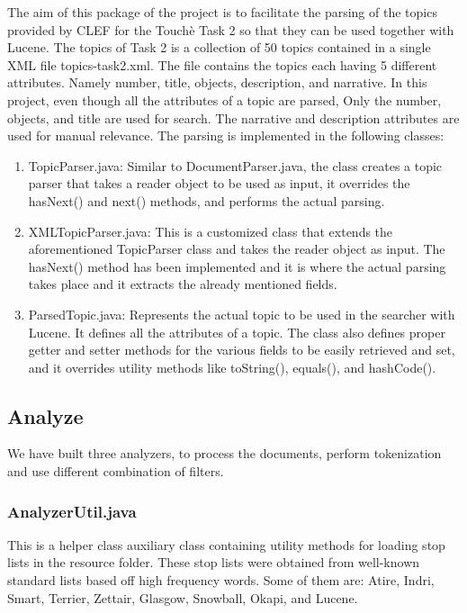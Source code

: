            The aim of this package of the project is to facilitate the parsing of the topics provided by CLEF for the Touchè Task 2 so that they can be used together with Lucene. The topics of Task 2 is a collection of 50 topics contained in a single XML file topics-task2.xml. The file contains the topics each having 5 different attributes. Namely number, title, objects, description, and narrative. In this project, even though all the attributes of a topic are parsed, Only the number, objects, and title are used for search. The narrative and description attributes are used for manual relevance. The parsing is implemented in the following classes:
            \begin{enumerate}
                \item 
                    TopicParser.java: Similar to DocumentParser.java, the class creates a     topic parser that takes a reader object to be used as input, it overrides the hasNext() and next() methods, and performs the actual parsing.
                \item 
                    XMLTopicParser.java: This is a customized class that  extends the aforementioned TopicParser class and takes the reader object as input. The hasNext() method has been implemented and it is where the actual parsing takes place and it extracts the already mentioned fields.
                \item
                    ParsedTopic.java: Represents the actual topic to be used in the searcher with Lucene. It defines all the attributes of a topic. The class also defines proper getter and setter methods for the various fields to be easily retrieved and set, and it overrides utility methods like toString(), equals(), and hashCode().
            \end{enumerate}
\subsection{Analyze}
  
    We have built three analyzers, to process the documents, perform tokenization and use different combination of filters.
\subsubsection{AnalyzerUtil.java}
            
            This is a helper class auxiliary class containing utility methods for loading stop lists in the resource folder. These stop lists were obtained from well-known standard lists based off high frequency words. Some of them are: Atire, Indri, Smart, Terrier, Zettair, Glasgow, Snowball, Okapi, and Lucene. 
